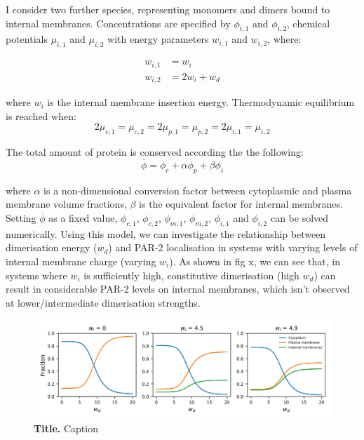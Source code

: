 \documentclass[12pt]{"report"}
\newcommand{\mycaption}[2]{\caption[#1]{\textbf{#1.} #2}}
\begin{document}
I consider two further species, representing monomers and dimers bound to internal membranes.  Concentrations are specified by $\phi_{i,1}$ and $\phi_{i,2}$, chemical potentials $\mu_{i,1}$ and $\mu_{i,2}$ with energy parameters $w_{i,1}$ and $w_{i,2}$, where:

\begin{align}
w_{i,1} &= w_i\\
w_{i,2} &= 2w_i + w_d
\end{align}

where $w_i$ is the internal membrane insertion energy. Thermodynamic equilibrium is reached when:
\begin{equation}
2\mu_{c,1} =  \mu_{c,2} = 2\mu_{p,1} =  \mu_{p,2} = 2\mu_{i,1} =  \mu_{i,2}
\end{equation}

The total amount of protein is conserved according the the following:
\begin{equation}
\overline{\phi} = \phi_c + \alpha\phi_p + \beta\phi_i
\end{equation}

where $\alpha$ is a non-dimensional conversion factor between cytoplasmic and plasma membrane volume fractions, $\beta$ is the equivalent factor for internal membranes. Setting $\overline{\phi}$ as a fixed value, $\phi_{c,1}$, $\phi_{c,2}$, $\phi_{m,1}$, $\phi_{m,2}$, $\phi_{i,1}$ and $\phi_{i,2}$ can be solved numerically. Using this model, we can investigate the relationship between dimerisation energy ($w_d$) and PAR-2 localisation in systems with varying levels of internal membrane charge (varying $w_i$). As shown in fig x, we can see that, in systems where $w_i$ is sufficiently high, constitutive dimerisation (high $w_d$) can result in considerable PAR-2 levels on internal membranes, which isn't observed at lower/intermediate dimerisation strengths. 

\begin{figure}[!h]
\includegraphics[scale=0.90]{six_species_thermodynamic}
\setlength{\abovecaptionskip}{20pt}
\centering
\mycaption{Title}{Caption}
\label{fig:six_species_thermodynamic}
\end{figure}
\end{document}
